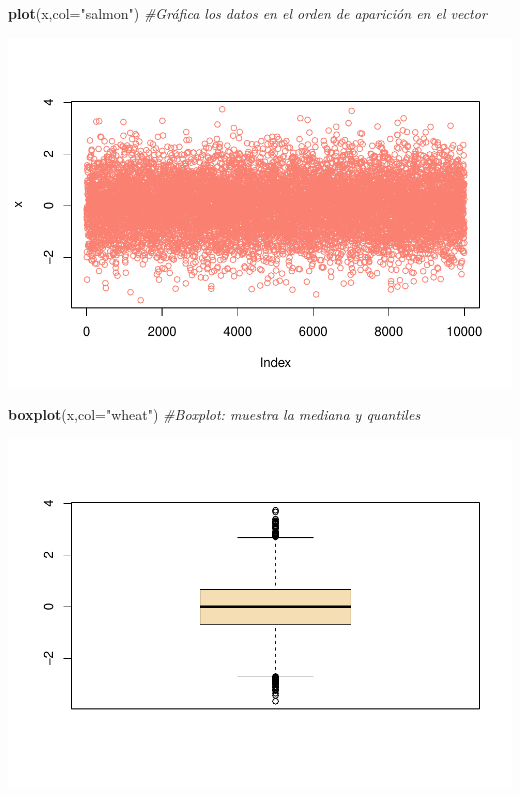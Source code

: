 \documentclass[
]{book}
\newenvironment{Shaded}{\begin{snugshade}}{\end{snugshade}}
\newcommand{\AttributeTok}[1]{\textcolor[rgb]{0.13,0.29,0.53}{#1}}
\newcommand{\CommentTok}[1]{\textcolor[rgb]{0.56,0.35,0.01}{\textit{#1}}}
\newcommand{\FunctionTok}[1]{\textcolor[rgb]{0.13,0.29,0.53}{\textbf{#1}}}
\newcommand{\NormalTok}[1]{#1}
\newcommand{\StringTok}[1]{\textcolor[rgb]{0.31,0.60,0.02}{#1}}
\begin{document}
\begin{Shaded}
\begin{Highlighting}[]
\FunctionTok{plot}\NormalTok{(x,}\AttributeTok{col=}\StringTok{"salmon"}\NormalTok{) }\CommentTok{\#Gráfica los datos en el orden de aparición en el vector }
\end{Highlighting}
\end{Shaded}

\includegraphics{bookdown-demo_files/figure-latex/unnamed-chunk-76-2.pdf}

\begin{Shaded}
\begin{Highlighting}[]
\FunctionTok{boxplot}\NormalTok{(x,}\AttributeTok{col=}\StringTok{"wheat"}\NormalTok{) }\CommentTok{\#Boxplot: muestra la mediana y quantiles}
\end{Highlighting}
\end{Shaded}

\includegraphics{bookdown-demo_files/figure-latex/unnamed-chunk-76-3.pdf}
\end{document}
